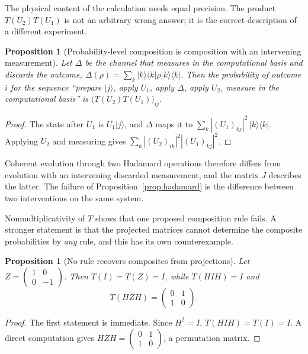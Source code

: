 \documentclass[11pt,oneside]{book}
\newtheorem{proposition}[theorem]{Proposition}
\theoremstyle{definition}
\theoremstyle{remark}
\begin{document}
The physical content of the calculation needs equal precision. The product $T(U_2)T(U_1)$ is not an arbitrary wrong answer; it is the correct description of a different experiment.

\begin{proposition}[Probability-level composition is composition with an intervening measurement]\label{prop:dephase}
Let $\Delta$ be the channel that measures in the computational basis and discards the outcome, $\Delta(\rho)=\sum_k |k\rangle\langle k|\rho|k\rangle\langle k|$. Then the probability of outcome $i$ for the sequence ``prepare $|j\rangle$, apply $U_1$, apply $\Delta$, apply $U_2$, measure in the computational basis'' is $\bigl(T(U_2)T(U_1)\bigr)_{ij}$.
\end{proposition}

\begin{proof}
The state after $U_1$ is $U_1|j\rangle$, and $\Delta$ maps it to $\sum_k |(U_1)_{kj}|^2\,|k\rangle\langle k|$. Applying $U_2$ and measuring gives $\sum_k |(U_2)_{ik}|^2|(U_1)_{kj}|^2$.
\end{proof}

Coherent evolution through two Hadamard operations therefore differs from evolution with an intervening discarded measurement, and the matrix $J$ describes the latter. The failure of Proposition~\ref{prop:hadamard} is the difference between two interventions on the same system.

Nonmultiplicativity of $T$ shows that one proposed composition rule fails. A stronger statement is that the projected matrices cannot determine the composite probabilities by \emph{any} rule, and this has its own counterexample.

\begin{proposition}[No rule recovers composites from projections]\label{prop:Z}
Let $Z=\begin{pmatrix}1&0\\0&-1\end{pmatrix}$. Then $T(I)=T(Z)=I$, while $T(HIH)=I$ and
\[
T(HZH)=\begin{pmatrix}0&1\\1&0\end{pmatrix}.
\]
\end{proposition}

\begin{proof}
The first statement is immediate. Since $H^2=I$, $T(HIH)=T(I)=I$. A direct computation gives $HZH=\begin{pmatrix}0&1\\1&0\end{pmatrix}$, a permutation matrix.
\end{proof}
\end{document}
